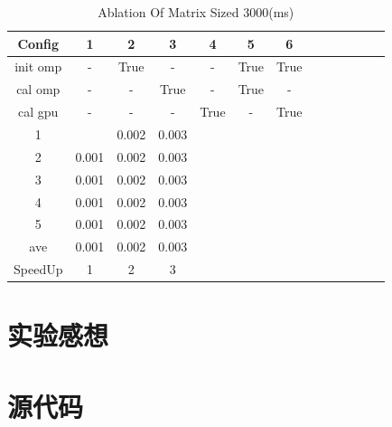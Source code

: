 \documentclass{article}
\begin{document}
\begin{table}[ht]
    \centering
    \begin{tabular}{|c|c|c|c|c|c|c|c|c|c|c|c|c|}
        \hline
        Config & 1 & 2 & 3 & 4 & 5 & 6 \\
        \hline
        init omp & - & True & - & - & True & True\\
        \hline
        cal omp & - & - & True & - & True & - \\
        \hline
        cal gpu & - & - & - & True & - & True \\
        \hline
        1 &  & 0.002 & 0.003 &  &  & \\
        2 & 0.001 & 0.002 & 0.003 &  &  & \\
        3 & 0.001 & 0.002 & 0.003 &  &  & \\
        4 & 0.001 & 0.002 & 0.003 &  &  & \\
        5 & 0.001 & 0.002 & 0.003 &  &  & \\
        ave & 0.001 & 0.002 & 0.003 &  &  & \\
        SpeedUp & 1 & 2 & 3 &  &  & \\
        \hline
    \end{tabular}
    \caption{Ablation Of Matrix Sized 3000(ms)}
    \label{tab:2}
\end{table}
\section{实验感想}

\newpage
\appendix
\section{源代码}
\end{document}
